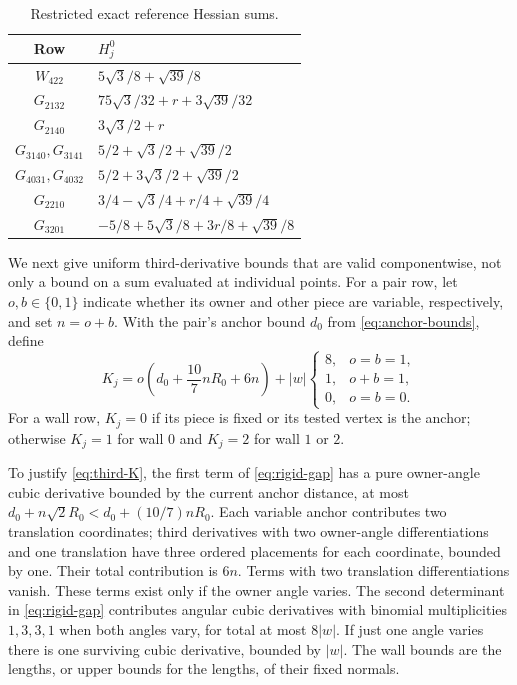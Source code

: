 \documentclass[11pt]{article}
\begin{document}
\begin{table}[htbp]
\centering
\small
\begin{tabular}{c l}
\hline
Row & $H_j^0$\\\hline
$W_{422}$ & $5\sqrt3/8+\sqrt{39}/8$\\
$G_{2132}$ & $75\sqrt3/32+r+3\sqrt{39}/32$\\
$G_{2140}$ & $3\sqrt3/2+r$\\
$G_{3140},G_{3141}$ & $5/2+\sqrt3/2+\sqrt{39}/2$\\
$G_{4031},G_{4032}$ & $5/2+3\sqrt3/2+\sqrt{39}/2$\\
$G_{2210}$ & $3/4-\sqrt3/4+r/4+\sqrt{39}/4$\\
$G_{3201}$ & $-5/8+5\sqrt3/8+3r/8+\sqrt{39}/8$\\\hline
\end{tabular}
\caption{Restricted exact reference Hessian sums.}\label{tab:hessian}
\end{table}

We next give uniform third-derivative bounds that are valid componentwise, not only a bound on a sum evaluated at individual points. For a pair row, let $o,b\in\{0,1\}$ indicate whether its owner and other piece are variable, respectively, and set $n=o+b$. With the pair's anchor bound $d_0$ from \eqref{eq:anchor-bounds}, define
\begin{equation}\label{eq:third-K}
 K_j=o\left(d_0+\frac{10}7nR_0+6n\right)
 +|w|\begin{cases}
 8,&o=b=1,\\
 1,&o+b=1,\\
 0,&o=b=0.
 \end{cases}
\end{equation}
For a wall row, $K_j=0$ if its piece is fixed or its tested vertex is the anchor; otherwise $K_j=1$ for wall $0$ and $K_j=2$ for wall $1$ or $2$.

To justify \eqref{eq:third-K}, the first term of \eqref{eq:rigid-gap} has a pure owner-angle cubic derivative bounded by the current anchor distance, at most $d_0+n\sqrt2R_0<d_0+(10/7)nR_0$. Each variable anchor contributes two translation coordinates; third derivatives with two owner-angle differentiations and one translation have three ordered placements for each coordinate, bounded by one. Their total contribution is $6n$. Terms with two translation differentiations vanish. These terms exist only if the owner angle varies. The second determinant in \eqref{eq:rigid-gap} contributes angular cubic derivatives with binomial multiplicities $1,3,3,1$ when both angles vary, for total at most $8|w|$. If just one angle varies there is one surviving cubic derivative, bounded by $|w|$. The wall bounds are the lengths, or upper bounds for the lengths, of their fixed normals.
\end{document}
